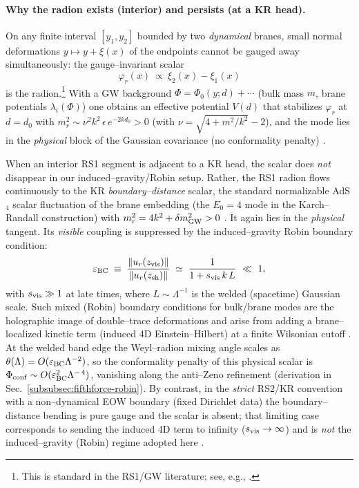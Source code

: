 \documentclass[10pt]{article}
\theoremstyle{definition}
\theoremstyle{plain}
\begin{document}
\paragraph{Why the radion exists (interior) and persists (at a KR head).}\label{par:uom-main-099}
On any finite interval \([y_1,y_2]\) bounded by two \emph{dynamical} branes, small normal deformations
\(y\mapsto y+\xi(x)\) of the endpoints cannot be gauged away simultaneously: the gauge–invariant scalar
\[
\varphi_r(x)\ \propto\ \xi_2(x)-\xi_1(x)
\]
is the radion.\footnote{This is standard in the RS1/GW literature; see, e.g.,
\cite{RandallSundrum1999RS1,GoldbergerWise1999,CsakiGraesserKribs2000}.}
With a GW background \(\Phi=\Phi_0(y;d)+\cdots\) (bulk mass \(m\), brane potentials \(\lambda_i(\Phi)\)) one obtains an
effective potential \(V(d)\) that stabilizes \(\varphi_r\) at \(d=d_0\) with
\(m_r^2\sim\nu^2 k^2\,\epsilon\,e^{-2kd_0}>0\) (with \(\nu=\sqrt{4+m^2/k^2}-2\)),
and the mode lies in the \emph{physical} block of the Gaussian covariance (no conformality penalty)
\cite{GoldbergerWise1999,CsakiGraesserKribs2000}.

When an interior RS1 segment is adjacent to a KR head, the scalar does \emph{not} disappear in our
induced--gravity/Robin setup. Rather, the RS1 radion flows continuously to the KR \emph{boundary--distance} scalar,
the standard normalizable AdS\(_4\) scalar fluctuation of the brane embedding (the $E_0{=}4$ mode in the
Karch–Randall construction) with \(m_r^2=4k^2+\delta m_{\rm GW}^2>0\)
\cite{KarchRandall2001,ArkaniHamedPorratiRandall2001}. It again lies in the \emph{physical} tangent.
Its \emph{visible} coupling is suppressed by the induced–gravity Robin boundary condition:
\[
\varepsilon_{\rm BC}\;\equiv\;\frac{\|u_r(z_{\rm vis})\|}{\|u_r(z_{\rm sh})\|}
\;\simeq\;\frac{1}{1+s_{\rm vis}\,k\,L}\ \ll\ 1,
\]
with $s_{\rm vis}\gg1$ at late times, where $L\sim \Lambda^{-1}$ is the welded (spacetime) Gaussian scale.
Such mixed (Robin) boundary conditions for bulk/brane modes are the holographic image of double–trace deformations
and arise from adding a brane–localized kinetic term (induced 4D Einstein–Hilbert) at a finite Wilsonian cutoff
\cite{Witten2001MultiTrace,Skenderis2002HR,ArkaniHamedPorratiRandall2001}. At the welded band edge the Weyl–radion
mixing angle scales as \(\theta(\Lambda)=O(\varepsilon_{\rm BC}\Lambda^{-2})\), so the conformality penalty of this
physical scalar is \(\Phi_{\rm conf}\sim O(\varepsilon_{\rm BC}^2\Lambda^{-\,4})\), vanishing along the anti–Zeno refinement
(derivation in Sec.~\ref{subsubsec:fifthforce-robin}). By contrast, in the \emph{strict} RS2/KR convention with a non–dynamical
EOW boundary (fixed Dirichlet data) the boundary–distance bending is pure gauge and the scalar is absent; that limiting
case corresponds to sending the induced 4D term to infinity ($s_{\rm vis}\to\infty$) and is \emph{not} the induced–gravity
(Robin) regime adopted here \cite{KarchRandall2001,Skenderis2002HR}.
\end{document}

